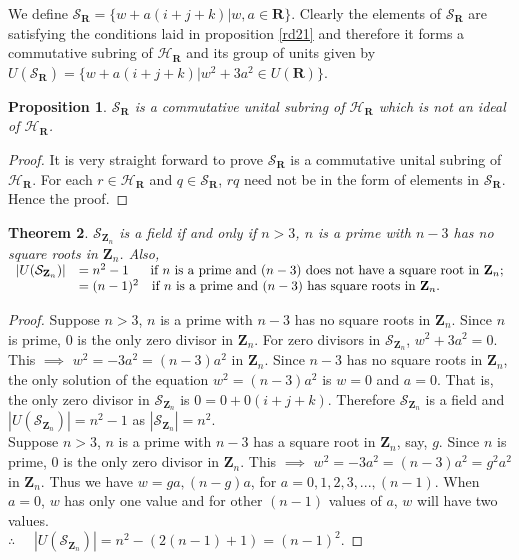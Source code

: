 \documentclass[sn-mathphys,Numbered]{sn-jnl}%
\theoremstyle{thmstyleone}
\newtheorem{theorem}{Theorem}
\newtheorem{proposition}[theorem]{Proposition}
\theoremstyle{thmstyletwo}
\theoremstyle{thmstylethree}
\begin{document}
We define $\mathcal{S}_{\mathbf{R}}=\{ w+a(i+j+k) | w,a \in \mathbf{R}\}$. Clearly the elements of $\mathcal{S}_{\mathbf{R}}$ are satisfying the conditions laid in proposition \ref{rd21} and therefore it forms a commutative subring of $\mathcal{H}_{\mathbf{R}}$ and its group of units given by $U(\mathcal{S}_{\mathbf{R}})=\{ w+a(i+j+k) | w^{2}+3a^{2} \in U(\mathbf{R})\}$.
\begin{proposition}
$\mathcal{S}_{\mathbf{R}}$ is a commutative unital subring of $\mathcal{H}_{\mathbf{R}}$ which is not an ideal of $\mathcal{H}_{\mathbf{R}}$.
\end{proposition}
\begin{proof}
It is very straight forward to prove $\mathcal{S}_{\mathbf{R}}$ is a commutative unital subring of $\mathcal{H}_{\mathbf{R}}$. For each $r \in \mathcal{H}_{\mathbf{R}}$ and $q \in \mathcal{S}_{\mathbf{R}}$, $rq$ need not be in the form of elements in $\mathcal{S}_{\mathbf{R}}$. Hence the proof. 
\end{proof}
\begin{theorem} \label{rd22}
$\mathcal{S}_{\mathbf{Z}_{n}}$ is a field if and only if $n>3$, $n$ is a prime with $n-3$ has no square roots in $\mathbf{Z}_{n}$. Also, \\
 $ \begin{array}{ll}
    |U(\mathcal{S}_{\mathbf{Z}_{n}})| &= n^{2}-1 \quad \ \ \hbox{if $n$ is a prime and $(n-3)$ does not have  a square root in $\mathbf{Z}_{n}$;}  \\
          & =(n-1)^{2} \quad \hbox{if $n$ is a prime and $(n-3$) has  square roots in $\mathbf{Z}_{n}$.}  
   \end{array}$
\end{theorem}
\begin{proof}
Suppose  $n>3$, $n$ is a prime with $n-3$ has no square roots in $\mathbf{Z}_{n}$. Since $n$ is prime, $0$ is the only zero divisor in $\mathbf{Z}_{n}$. For zero divisors in $\mathcal{S}_{\mathbf{Z}_{n}}$, $w^{2}+3a^{2}=0$. This $\implies$ $w^{2}=-3a^{2}=(n-3)a^{2}$ in $\mathbf{Z}_{n}$. Since $n-3$ has no square roots in $\mathbf{Z}_{n}$, the only solution of the equation $w^{2}=(n-3)a^{2}$ is $w=0$ and $a=0$. That is, the only zero divisor in $\mathcal{S}_{\mathbf{Z}_{n}}$ is $0=0+0(i+j+k)$. Therefore $\mathcal{S}_{\mathbf{Z}_{n}}$ is a field and 
 $|U(\mathcal{S}_{\mathbf{Z}_{n}})|= n^{2}-1$ as $|\mathcal{S}_{\mathbf{Z}_{n}}|=n^{2}$.\\
Suppose  $n>3$, $n$ is a prime with $n-3$ has  a square root in $\mathbf{Z}_{n}$, say, $g$. Since $n$ is prime, $0$ is the only zero divisor in $\mathbf{Z}_{n}$. This $\implies$ $w^{2}=-3a^{2}=(n-3)a^{2}=g^{2}a^{2}$ in $\mathbf{Z}_{n}$. Thus we have $w=ga, (n-g)a$, for $a=0,1,2,3,...,(n-1)$. When $a=0$, $w$ has only one value and for other $(n-1)$ values of $a$, $w$ will have two values. \\
 $\therefore \quad $ $|U(\mathcal{S}_{\mathbf{Z}_{n}})|= n^{2}-(2(n-1)+1)=(n-1)^{2}$. 
\end{proof}
\end{document}
